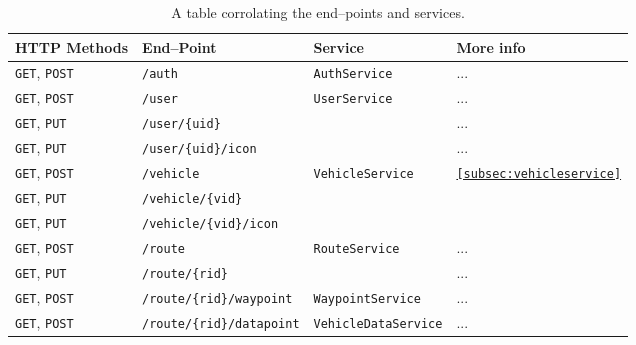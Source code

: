 \begin{table}[ht]
    \centering
    \small
    \setlength\extrarowheight{1pt}
    \begin{tabularx}{0.9\textwidth}{l p{13em} l l}
        \textbf{HTTP Methods}       & \textbf{End--Point}               & \textbf{Service}             & \textbf{More info}  \\ \hline
        \texttt{GET}, \texttt{POST} & \texttt{/auth}                    & \texttt{AuthService}         & ... \\ \tblgrpsep
        \texttt{GET}, \texttt{POST} & \texttt{/user}                    & \multirow{3}{*}{\texttt{UserService}}         & ... \\
        \texttt{GET}, \texttt{PUT}  & \texttt{/user/\{uid\}}            &          & ... \\
        \texttt{GET}, \texttt{PUT}  & \texttt{/user/\{uid\}/icon}       &          & ... \\ \tblgrpsep

        \texttt{GET}, \texttt{POST} & \texttt{/vehicle}                 & \multirow{3}{*}{\texttt{VehicleService}}      & \multirow{3}{*}{\texttt{\cref{subsec:vehicleservice}}} \\
        \texttt{GET}, \texttt{PUT}  & \texttt{/vehicle/\{vid\}}         &       &  \\
        \texttt{GET}, \texttt{PUT}  & \texttt{/vehicle/\{vid\}/icon}    &       &  \\ \tblgrpsep

        \texttt{GET}, \texttt{POST} & \texttt{/route}                   & \multirow{2}{*}{\texttt{RouteService}}        & ... \\
        \texttt{GET}, \texttt{PUT}  & \texttt{/route/\{rid\}}           &        & ... \\
        \texttt{GET}, \texttt{POST} & \texttt{/route/\{rid\}/waypoint}  & \texttt{WaypointService}     & ... \\
        \texttt{GET}, \texttt{POST} & \texttt{/route/\{rid\}/datapoint} & \texttt{VehicleDataService}  & ... \\ 
    \end{tabularx}
    \caption{A table corrolating the end--points and services.}\label{table:endpointservice}
\end{table}
